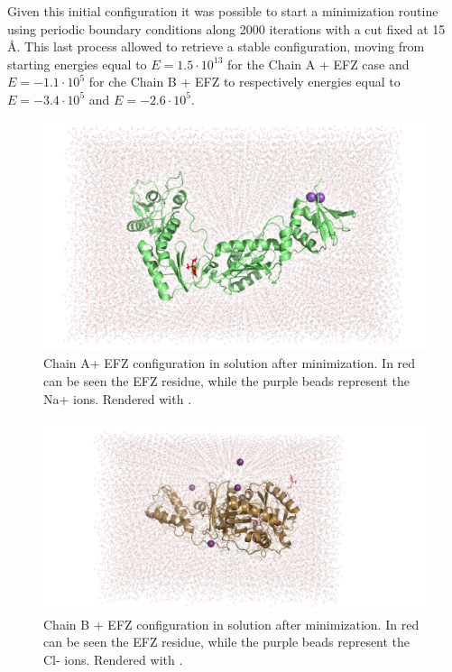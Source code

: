 \documentclass[12pt]{article}
\begin{document}
Given this initial configuration it was possible to start a minimization routine using periodic boundary conditions along 2000 iterations with a cut fixed at 15 \AA. This last process allowed to retrieve a stable configuration, moving from starting energies equal to $E=1.5\cdot 10^{13}$ for the Chain A + EFZ case and $E=-1.1\cdot 10^{5}$ for che Chain B + EFZ to respectively energies equal to $E=-3.4\cdot 10^{5}$ and $E=-2.6\cdot 10^{5}$.

\begin{figure}
    \centering
    \includegraphics[width=0.8\linewidth, clip, trim= 0 0 0 0]{../figures/chain_a_efz_solv.png}
    \caption{Chain A+ EFZ configuration in solution after minimization. In red can be seen the EFZ residue, while the purple beads represent the Na+ ions. Rendered with \cite[Pymol]{pymol}.\label{fig:chain_a_efz_solv}}
\end{figure}

\begin{figure}
    \centering
    \includegraphics[width=0.8\linewidth, clip, trim= 0 0 0 0]{../figures/chain_b_efz_solv.png}
    \caption{Chain B + EFZ configuration in solution after minimization. In red can be seen the EFZ residue, while the purple beads represent the Cl- ions. Rendered with \cite[Pymol]{pymol}.\label{fig:chain_b_efz_solv}}
\end{figure}
\end{document}
